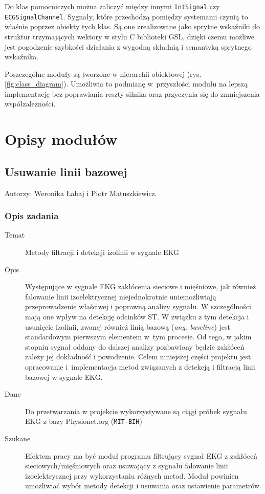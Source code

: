 \documentclass[a4paper, 11pt]{article}
\begin{document}
Do klas pomocniczych można zaliczyć między innymi \verb+IntSignal+ czy \verb+ECGSignalChannel+. Sygnały, które przechodzą pomiędzy systemami czynią to właśnie poprzez obiekty tych klas. Są one zrealizowane jako sprytne wskaźniki do struktur trzymających wektory w stylu C biblioteki GSL, dzięki czemu możliwe jest pogodzenie szybkości działania z wygodną składnią i semantyką sprytnego wskaźnika.

Poszczególne moduły są tworzone w hierarchii obiektowej (rys. \ref{fig:class_diagram}). Umożliwia to podmianę w~przyszłości modułu na lepszą implementację bez poprawiania reszty silnika oraz przyczynia się do zmniejszenia współzależności.

\section{Opisy modułów}
\label{sec:mod}

\subsection{Usuwanie linii bazowej}
\label{sec:baseline}
Autorzy: Weronika Łabaj i Piotr Matuszkiewicz.

\subsubsection{Opis zadania}
\label{sec:baseline:desc}

\begin{description}
\item[Temat] Metody filtracji i detekcji izolinii w sygnale EKG
\item[Opis] Występujące w sygnale EKG zakłócenia sieciowe i mięśniowe, jak również falowanie linii izoelektrycznej niejednokrotnie uniemożliwiają przeprowadzenie właściwej i poprawną analizy sygnału. W szczególności mają one wpływ na detekcję odcinków ST. W związku z tym detekcja i usunięcie izolinii, zwanej również linią bazową (\textit{ang. baseline}) jest standardowym pierwszym elementem w~tym procesie. Od tego, w jakim stopniu sygnał oddany do dalszej analizy pozbawiony będzie zakłóceń zależy jej dokładność i powodzenie. Celem niniejszej części projektu jest opracowanie i~implementacja metod związanych z detekcją i filtracją linii bazowej w sygnale EKG.
\item[Dane] Do przetwarzania w projekcie wykorzystywane są ciągi próbek sygnału EKG z bazy Physionet.org (\verb|MIT-BIH|)
\item[Szukane] Efektem pracy ma być moduł programu filtrujący sygnał EKG z zakłóceń sieciowych/mięśniowych oraz usuwający z sygnału falowanie linii izoelektrycznej przy wykorzystaniu różnych metod. Moduł powinien umożliwiać wybór metody detekcji i usuwania oraz ustawienie parametrów.
\end{description}
\end{document}
